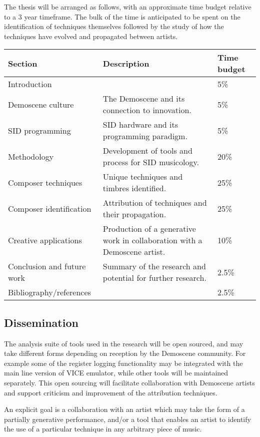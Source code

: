 \documentclass[10pt]{article}
\begin{document}
\begin{multicols*}{2}
The thesis will be arranged as follows, with an approximate time budget relative to a 3 year timeframe. The bulk of the time is anticipated to be spent on the identification of techniques themselves followed by the study of how the techniques have evolved and propagated between artists.

  \begin{tabular}{|l|l|l|}
        \hline
        Section & Description & Time budget \\
        \hline
        Introduction &  & 5\% \\
        \hline
        Demoscene culture & The Demoscene and its connection to innovation. & 5\% \\
        \hline
        SID programming & SID hardware and its programming paradigm. & 5\% \\
        \hline
        Methodology & Development of tools and process for SID musicology. & 20\% \\
        \hline
        Composer techniques & Unique techniques and timbres identified. & 25\% \\
        \hline
        Composer identification & Attribution of techniques and their propagation. & 25\% \\
        \hline
        Creative applications & Production of a generative work in collaboration with a Demoscene artist.  & 10\% \\
        \hline
        Conclusion and future work & Summary of the research and potential for further research. & 2.5\% \\
        \hline
        Bibliography/references &  & 2.5\% \\
        \hline
  \end{tabular}

  \subsection{Dissemination}

  The analysis suite of tools used in the research will be open sourced, and may take different forms depending on reception by the Demoscene community. For example some of the register logging functionality may be integrated with the main line version of VICE emulator, while other tools will be maintained separately. This open sourcing will facilitate collaboration with Demoscene artists and support criticism and improvement of the attribution techniques.

  An explicit goal is a collaboration with an artist which may take the form of a partially generative performance, and/or a tool that enables an artist to identify the use of a particular technique in any arbitrary piece of music.


\end{multicols*}
\end{document}
